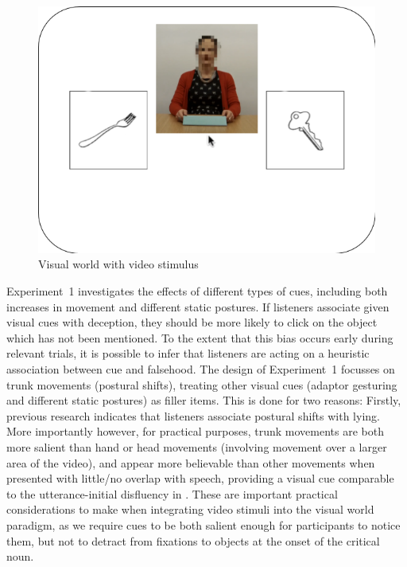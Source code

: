 \documentclass[a4paper,man,natbib]{apa6}
\begin{document}
\begin{figure}[Ht]
  \centering
	\includegraphics[width=\linewidth]{./img/e7_layout.png}
  \caption{Visual world with video stimulus}
  \label{fig:v1_layout}
\end{figure}

Experiment~1 investigates the effects of different types of cues, including both increases in movement and different static postures.
If listeners associate given visual cues with deception, they should be more likely to click on the object which has not been mentioned.
To the extent that this bias occurs early during relevant trials, it is possible to infer that listeners are acting on a heuristic association between cue and falsehood.
The design of Experiment~1 focusses on trunk movements (postural shifts), treating other visual cues (adaptor gesturing and different static postures) as filler items.
This is done for two reasons: Firstly, previous research indicates that listeners associate postural shifts with lying\citep{Vrij1996a}.
More importantly however, for practical purposes, trunk movements are both more salient than hand or head movements (involving movement over a larger area of the video), and appear more believable than other movements when presented with little/no overlap with speech, providing a visual cue comparable to the utterance-initial disfluency in \citet{Loy2017}.
These are important practical considerations to make when integrating video stimuli into the visual world paradigm, as we require cues to be both salient enough for participants to notice them, but not to detract from fixations to objects at the onset of the critical noun.
\end{document}
